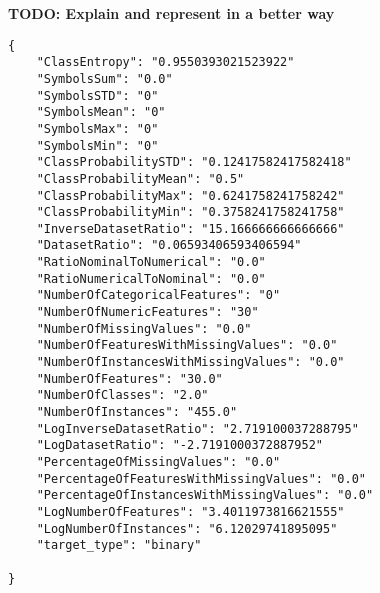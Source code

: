 \textbf{TODO: Explain and represent in a better way}

\begin{lstlisting}
{
	"ClassEntropy": "0.9550393021523922"
    "SymbolsSum": "0.0"
    "SymbolsSTD": "0"
    "SymbolsMean": "0"
    "SymbolsMax": "0"
    "SymbolsMin": "0"
    "ClassProbabilitySTD": "0.12417582417582418"
    "ClassProbabilityMean": "0.5"
    "ClassProbabilityMax": "0.6241758241758242"
    "ClassProbabilityMin": "0.3758241758241758"
    "InverseDatasetRatio": "15.166666666666666"
    "DatasetRatio": "0.06593406593406594"
    "RatioNominalToNumerical": "0.0"
    "RatioNumericalToNominal": "0.0"
    "NumberOfCategoricalFeatures": "0"
    "NumberOfNumericFeatures": "30"
    "NumberOfMissingValues": "0.0"
    "NumberOfFeaturesWithMissingValues": "0.0"
    "NumberOfInstancesWithMissingValues": "0.0"
    "NumberOfFeatures": "30.0"
    "NumberOfClasses": "2.0"
    "NumberOfInstances": "455.0"
    "LogInverseDatasetRatio": "2.719100037288795"
    "LogDatasetRatio": "-2.7191000372887952"
    "PercentageOfMissingValues": "0.0"
    "PercentageOfFeaturesWithMissingValues": "0.0"
    "PercentageOfInstancesWithMissingValues": "0.0"
    "LogNumberOfFeatures": "3.4011973816621555"
    "LogNumberOfInstances": "6.12029741895095"
    "target_type": "binary"

}
\end{lstlisting}

